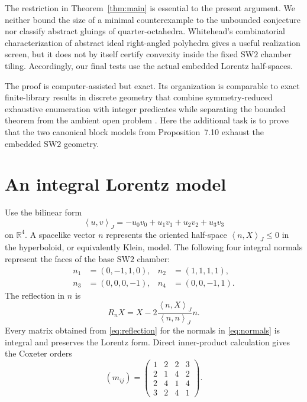 \documentclass[11pt]{article}
\theoremstyle{remark}
\newcommand{\inner}[2]{\left\langle #1,#2\right\rangle_J}
\begin{document}
The restriction in Theorem~\ref{thm:main} is essential to the present
argument.  We neither bound the size of a minimal counterexample to the
unbounded conjecture nor classify abstract gluings of quarter-octahedra.
Whitehead's combinatorial characterization of abstract ideal right-angled
polyhedra \cite{whitehead2026note} gives a useful realization screen, but it
does not by itself certify convexity inside the fixed $\mathrm{SW2}$ chamber
tiling.  Accordingly, our final tests use the actual embedded Lorentz
half-spaces.

The proof is computer-assisted but exact.  Its organization is comparable
to exact finite-library results in discrete geometry that combine
symmetry-reduced exhaustive enumeration with integer predicates while
separating the bounded theorem from the ambient open problem
\cite{zeng2026finite}.  Here the additional task is to prove that the two
canonical block models from Proposition~7.10 exhaust the embedded
$\mathrm{SW2}$ geometry.

\section{An integral Lorentz model}

Use the bilinear form
\[
  \inner uv=-u_0v_0+u_1v_1+u_2v_2+u_3v_3
\]
on $\mathbb R^4$.  A spacelike vector $n$ represents the oriented
half-space $\inner nX\leq 0$ in the hyperboloid, or equivalently Klein,
model.  The following four integral normals represent the faces of the base
$\mathrm{SW2}$ chamber:
\begin{equation}\label{eq:normals}
\begin{aligned}
 n_1&=(0,-1,1,0), & n_2&=(1,1,1,1),\\
 n_3&=(0,0,0,-1),& n_4&=(0,0,-1,1).
\end{aligned}
\end{equation}
The reflection in $n$ is
\begin{equation}\label{eq:reflection}
 R_nX=X-2\frac{\inner nX}{\inner nn}n.
\end{equation}
Every matrix obtained from \eqref{eq:reflection} for the normals in
\eqref{eq:normals} is integral and preserves the Lorentz form.  Direct
inner-product calculation gives the Coxeter orders
\begin{equation}\label{eq:coxeter}
 (m_{ij})=
 \begin{pmatrix}
 1&2&2&3\\
 2&1&4&2\\
 2&4&1&4\\
 3&2&4&1
 \end{pmatrix}.
\end{equation}
\end{document}
